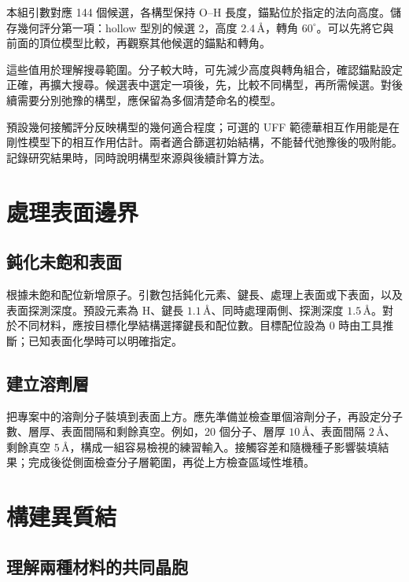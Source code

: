 本組引數對應 144 個候選，各構型保持 O--H 長度，錨點位於指定的法向高度。儲存幾何評分第一項：hollow 型別的候選 2，高度 $2.4\,\text{\AA}$，轉角 $60^\circ$。可以先將它與前面的頂位模型比較，再觀察其他候選的錨點和轉角。

這些值用於理解搜尋範圍。分子較大時，可先減少高度與轉角組合，確認錨點設定正確，再擴大搜尋。候選表中選定一項後，先，比較不同構型，再所需候選。對後續需要分別弛豫的構型，應保留為多個清楚命名的模型。

預設幾何接觸評分反映構型的幾何適合程度；可選的 UFF 範德華相互作用能是在剛性模型下的相互作用估計。兩者適合篩選初始結構，不能替代弛豫後的吸附能。記錄研究結果時，同時說明構型來源與後續計算方法。

\section{處理表面邊界}

\subsection{鈍化未飽和表面}

根據未飽和配位新增原子。引數包括鈍化元素、鍵長、處理上表面或下表面，以及表面探測深度。預設元素為 H、鍵長 $1.1\,\text{\AA}$、同時處理兩側、探測深度 $1.5\,\text{\AA}$。對於不同材料，應按目標化學結構選擇鍵長和配位數。目標配位設為 0 時由工具推斷；已知表面化學時可以明確指定。

\subsection{建立溶劑層}

把專案中的溶劑分子裝填到表面上方。應先準備並檢查單個溶劑分子，再設定分子數、層厚、表面間隔和剩餘真空。例如，20 個分子、層厚 $10\,\text{\AA}$、表面間隔 $2\,\text{\AA}$、剩餘真空 $5\,\text{\AA}$，構成一組容易檢視的練習輸入。接觸容差和隨機種子影響裝填結果；完成後從側面檢查分子層範圍，再從上方檢查區域性堆積。

\section{構建異質結}\label{sec:heterojunction}

\subsection{理解兩種材料的共同晶胞}

